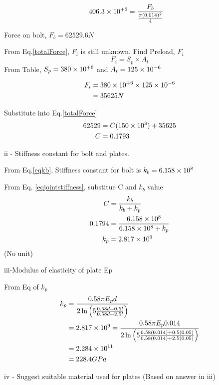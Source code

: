\documentclass[a4paper, fleqn]{article}
\providecommand{\sci}[1]{\protect\ensuremath{\times 10^{\StrSubstitute[0]{#1}{e}{}}}}
\begin{document}
\begin{equation*}
    \begin{aligned}
    406.3\sci{e+6} &=\frac{F_b}{\frac{\pi (0.014)^2}{4}}
    \end{aligned}
\end{equation*}

Force on bolt, $F_b=62529.6N$

From Eq.\ref{totalForce}, $F_i$ is still unknown.
Find Preload, $F_i$
\begin{equation*}
    F_i=S_p \times A_t
\end{equation*}
From Table, $S_p=380\sci{e+6}$ and $A_t=125\sci{e-6}$

\begin{equation*}
    \begin{aligned}
    F_i&=380\sci{e+6} \times 125\sci{e-6}\\
    &=35625N 
    \end{aligned}
\end{equation*}

Substitute into Eq.\ref{totalForce}
\begin{equation*}
    \begin{aligned}
    62529 &= C(150\sci{e3})+35625 \\
    C &=0.1793
    \end{aligned}
\end{equation*}

ii - Stiffness constant for bolt and plates.


From Eq.\ref{eqkb}, Stiffness constant for bolt is $k_b=6.158\sci{e8}$

From Eq. \ref{eqjointstiffness}, substitue C and $k_b$ value
\begin{equation*}
    \begin{aligned}
    C &=\frac{k_b}{k_b+k_p}\\
    0.1794 &= \frac{6.158\sci{e8}}{6.158\sci{e8}+k_p} \\
    k_p &=2.817\sci{e9}
    \end{aligned}
\end{equation*}
(No unit)
\vspace{10pt}

iii-Modulus of elasticity of plate Ep

From Eq of $k_p$
\begin{equation}
    \begin{aligned}
        k_p &=\frac{0.58\pi E_p d}{2\ln\left( 5\frac{0.58d+0.5l}{0.58d+2.5l} \right)} \\
        &=2.817\times10^9=\frac{0.58\pi E_p 0.014}{2\ln\left( 5\frac{0.58(0.014)+0.5(0.05)}{0.58(0.014)+2.5(0.05)} \right)}\\
        &=2.284\sci{e11}\\
        &=228.4GPa
    \end{aligned}
\end{equation}


iv - Suggest suitable material used for plates (Based on answer in iii)
\end{document}
